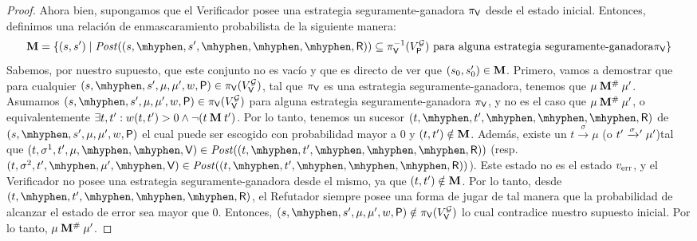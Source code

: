 \begin{proof}
Ahora bien,  supongamos que el Verificador posee una estrategia seguramente-ganadora $\pi_{\mathsf{V}}$
desde el estado inicial. Entonces, definimos una relación de enmascaramiento probabilista de la siguiente manera: 
\[
\M =\{(s,s') \mid \post((s, \mhyphen, s', \mhyphen, \mhyphen, \mhyphen, \Refuter)) \subseteq \strat{\Verifier}^{-1}(V^{\StochG}_\Probabilistic) \text{ para alguna estrategia seguramente-ganadora} \strat{\Verifier} \}
\]
Sabemos, por nuestro supuesto, que este conjunto no es vacío y que es directo de ver que $(s_0,s'_0) \in \mathbin{\mathbf{M}}$. 
Primero, vamos a demostrar que para cualquier $(s, \mhyphen, s', \mu, \mu', w, \Probabilistic) \in \strat{\Verifier}(V^{\StochG}_\Verifier)$,  tal que   $\pi_{\mathsf{V}}$ es una estrategia seguramente-ganadora,  
tenemos que  $\mu \mathbin{\mathbf{M^{\#}}} \mu'$. 
Asumamos $(s, \mhyphen, s', \mu, \mu', w, \Probabilistic) \in \strat{\Verifier}(V^{\StochG}_\Verifier)$ para alguna estrategia seguramente-ganadora $\pi_{\mathsf{V}}$, y no es el caso que $\mu \mathbin{\mathbf{M^{\#}}} \mu'$, o equivalentemente 
$\exists t,t' : w(t,t') > 0 \wedge \neg (t \mathbin{\mathbf{M}} t')$. 
Por lo tanto, tenemos un sucesor $(t, \mhyphen,t', \mhyphen,\mhyphen,\mhyphen, \Refuter)$ de
$(s, \mhyphen, s', \mu, \mu', w, \Probabilistic)$ el cual puede ser escogido con probabilidad mayor a $0$ y  $(t,t') \notin \mathbin{\mathbf{M}}$. 
Además, existe un $t \xrightarrow{\sigma} \mu$ 
(o $t' \mathrel{{\xrightarrow[]{\sigma}}{}'} \mu'$)tal que $(t, \sigma^1, t', \mu, \mhyphen, \mhyphen, \Verifier) \in \post((t, \mhyphen,t', \mhyphen,\mhyphen,\mhyphen, \Refuter))$ 
(resp. $(t, \sigma^2, t', \mhyphen,  \mu', \mhyphen, \Verifier) \in \post((t, \mhyphen,t', \mhyphen,\mhyphen,\mhyphen, \Refuter))$). 
Este estado no es el estado $v_{\text{err}}$, y el Verificador no posee una estrategia seguramente-ganadora desde el mismo, ya que $(t,t') \notin \mathbin{\mathbf{M}}$.  Por lo tanto,  desde 
$(t, \mhyphen,t', \mhyphen,\mhyphen,\mhyphen, \Refuter)$, el Refutador siempre posee una forma de jugar de tal manera que la probabilidad de alcanzar el estado de error sea mayor que $0$.  Entonces, 
$(s, \mhyphen, s', \mu, \mu', w, \Probabilistic) \notin \strat{\Verifier}(V^{\StochG}_\Verifier)$ lo cual contradice nuestro supuesto inicial. 
Por lo tanto, $\mu \mathbin{\mathbf{M^{\#}}} \mu'$.


\end{proof}
